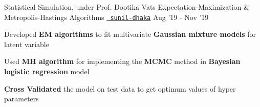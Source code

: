 \begin{cventries}
  \cventry
  {Statistical Simulation, under Prof. Dootika Vats}
  {Expectation-Maximization \& Metropolis-Hastings Algorithms}
  {\texttt{\href{https://github.com/sunil-dhaka/}{\faGithub{} sunil-dhaka}}}
  {Aug '19 - Nov '19}
  {
    \begin{cvitems}
      \item Developed \textbf{EM algorithms} to fit multivariate \textbf{Gaussian mixture models} for latent variable 
	    \item Used \textbf{MH algorithm} for implementing the \textbf{MCMC} method in \textbf{Bayesian logistic regression} model
	    \item \textbf{Cross Validated} the model on test data to get optimum values of hyper parameters
    \end{cvitems}
  }
\end{cventries}
\vspace{-2mm}
